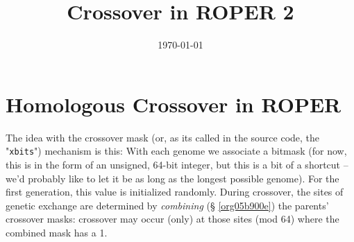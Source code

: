 \documentclass[11pt]{article}
\date{\today}
\title{Crossover in ROPER 2}
\begin{document}
\maketitle
\tableofcontents


\section{Homologous Crossover in ROPER}
\label{sec:orgb7c2a99}
The idea with the crossover mask (or, as its called in the source code, the
"\texttt{xbits}") mechanism is this: With each genome we associate a bitmask (for now,
this is in the form of an unsigned, 64-bit integer, but this is a bit of a
shortcut -- we'd probably like to let it be as long as the longest possible
genome). For the first generation, this value is initialized randomly. During
crossover, the sites of genetic exchange are determined by \emph{combining} (\S
\ref{org05b900e}) the parents' crossover masks: crossover may occur (only) at
those sites (mod 64) where the combined mask has a 1.
\end{document}
